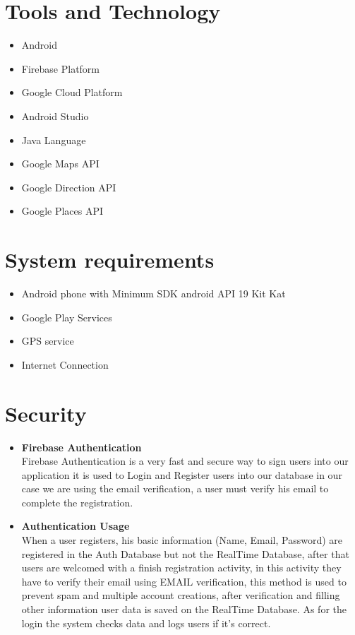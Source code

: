 \section{Tools and Technology}
\begin{itemize}
\item Android
\item Firebase Platform
\item Google Cloud Platform
\item Android Studio
\item Java Language
\item Google Maps API
\item Google Direction API
\item Google Places API
\end{itemize}

\section{System requirements}
\begin{itemize}
\item Android phone with Minimum SDK android API 19 Kit Kat 
\item Google Play Services
\item GPS service
\item Internet Connection
\end{itemize}

\section{Security}
\begin{itemize}
\item \textbf{Firebase Authentication}\\ 
Firebase Authentication is a very fast and secure way to sign users into our application it is used to Login and Register users into our database in our case we are using the email verification, a user must verify his email to complete the registration.
\item \textbf{Authentication Usage}\\
When a user registers, his basic information (Name, Email, Password) are registered in the Auth Database but not the RealTime Database, after that users are welcomed with a finish registration activity, in this activity they have to verify their email using EMAIL verification, this method is used to prevent spam and multiple account creations, after verification and filling other information user data is saved on the RealTime Database. As for the login the system checks data and logs users if it’s correct.
\end{itemize}


